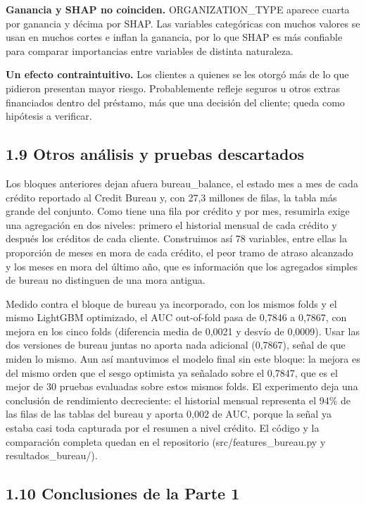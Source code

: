 \documentclass[11pt,a4paper]{article}
\begin{document}
\textbf{Ganancia y SHAP no coinciden.} ORGANIZATION\_\allowbreak{}TYPE aparece cuarta por ganancia y décima por SHAP. Las variables categóricas con muchos valores se usan en muchos cortes e inflan la ganancia, por lo que SHAP es más confiable para comparar importancias entre variables de distinta naturaleza.

\textbf{Un efecto contraintuitivo.} Los clientes a quienes se les otorgó más de lo que pidieron presentan mayor riesgo. Probablemente refleje seguros u otros extras financiados dentro del préstamo, más que una decisión del cliente; queda como hipótesis a verificar.

\subsection*{1.9 Otros análisis y pruebas descartados}

Los bloques anteriores dejan afuera bureau\_\allowbreak{}balance, el estado mes a mes de cada crédito reportado al Credit Bureau y, con 27,3 millones de filas, la tabla más grande del conjunto. Como tiene una fila por crédito y por mes, resumirla exige una agregación en dos niveles: primero el historial mensual de cada crédito y después los créditos de cada cliente. Construimos así 78 variables, entre ellas la proporción de meses en mora de cada crédito, el peor tramo de atraso alcanzado y los meses en mora del último año, que es información que los agregados simples de bureau no distinguen de una mora antigua.

Medido contra el bloque de bureau ya incorporado, con los mismos folds y el mismo LightGBM optimizado, el AUC out-of-fold pasa de 0,7846 a 0,7867, con mejora en los cinco folds (diferencia media de 0,0021 y desvío de 0,0009). Usar las dos versiones de bureau juntas no aporta nada adicional (0,7867), señal de que miden lo mismo. Aun así mantuvimos el modelo final sin este bloque: la mejora es del mismo orden que el sesgo optimista ya señalado sobre el 0,7847, que es el mejor de 30 pruebas evaluadas sobre estos mismos folds. El experimento deja una conclusión de rendimiento decreciente: el historial mensual representa el 94\% de las filas de las tablas del bureau y aporta 0,002 de AUC, porque la señal ya estaba casi toda capturada por el resumen a nivel crédito. El código y la comparación completa quedan en el repositorio (src/features\_\allowbreak{}bureau.py y resultados\_\allowbreak{}bureau/).

\subsection*{1.10 Conclusiones de la Parte 1}
\end{document}
